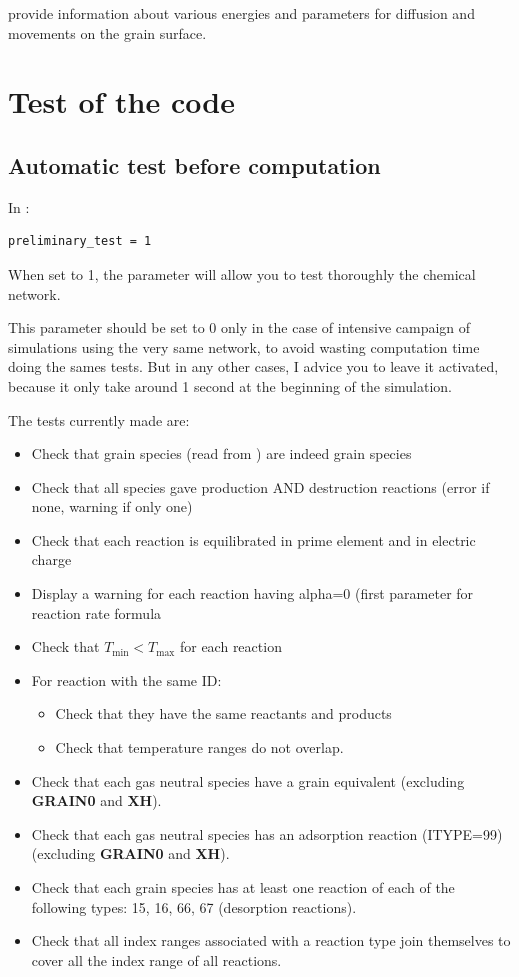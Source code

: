 \documentclass[english,a4paper,twoside]{article}
\begin{document}
 provide information about various energies and parameters for diffusion and movements on the grain surface.

\section{Test of the code}
\subsection{Automatic test before computation}
In : 
\begin{verbatim}
preliminary_test = 1
\end{verbatim}

When set to 1, the parameter  will allow you to test thoroughly the chemical network. 

\begin{remarque}
This parameter should be set to 0 only in the case of intensive campaign of simulations using the very same network, to avoid wasting computation time doing the sames tests. But in any other cases, I advice you to leave it activated, because it only take around 1 second at the beginning of the simulation.
\end{remarque}

The tests currently made are:
\begin{itemize}
\item Check that grain species (read from ) are indeed grain species
\item Check that all species gave production AND destruction reactions (error if none, warning if only one)
\item Check that each reaction is equilibrated in prime element and in electric charge
\item Display a warning for each reaction having alpha=0 (first parameter for reaction rate formula
\item Check that $T_\text{min} < T_\text{max}$ for each reaction
\item For reaction with the same ID:
\begin{itemize}
\item Check that they have the same reactants and products
\item Check that temperature ranges do not overlap.
\end{itemize}
\item Check that each gas neutral species have a grain equivalent (excluding \textbf{GRAIN0} and \textbf{XH}).
\item Check that each gas neutral species has an adsorption reaction (ITYPE=99) (excluding \textbf{GRAIN0} and \textbf{XH}).
\item Check that each grain species has at least one reaction of each of the following types: 15, 16, 66, 67 (desorption reactions).
\item Check that all index ranges associated with a reaction type join themselves to cover all the index range of all reactions.
\end{itemize}
\end{document}
